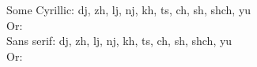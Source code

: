 \documentclass{article}
\newcommand\cyr{%
  \renewcommand\rmdefault{wncyr}%
  \renewcommand\sfdefault{wncyss}%
  \renewcommand\encodingdefault{OT2}%
  \normalfont
  \selectfont}
\begin{document}
  \noindent Some Cyrillic: {\cyr  dj, zh, lj, nj, kh, ts, ch, sh, shch, yu}\\
  Or: \\
  Sans serif: {\cyr\sffamily  dj, zh, lj, nj, kh, ts, ch, sh, shch, yu}\\
  Or: 
\end{document}

